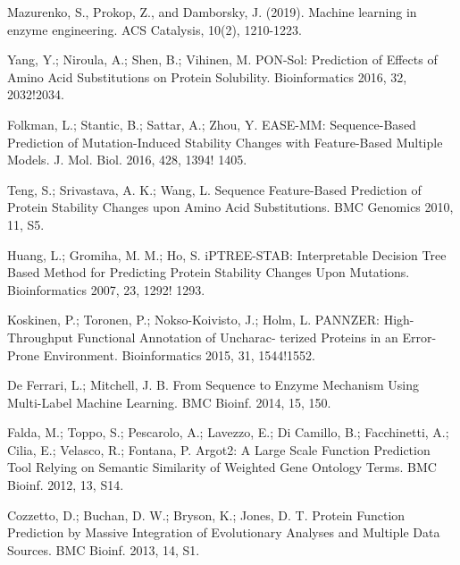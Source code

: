 \documentclass[12pt]{article}
\begin{document}
\begin{thebibliography}{20}
Mazurenko, S., Prokop, Z., and Damborsky, J. (2019). Machine learning in enzyme engineering. ACS Catalysis, 10(2), 1210-1223. 

 Yang, Y.; Niroula, A.; Shen, B.; Vihinen, M. PON-Sol: Prediction of Effects of Amino Acid Substitutions on Protein Solubility. Bioinformatics 2016, 32, 2032!2034.

 Folkman, L.; Stantic, B.; Sattar, A.; Zhou, Y. EASE-MM: Sequence-Based Prediction of Mutation-Induced Stability Changes with Feature-Based Multiple Models. J. Mol. Biol. 2016, 428, 1394! 1405.

 Teng, S.; Srivastava, A. K.; Wang, L. Sequence Feature-Based Prediction of Protein Stability Changes upon Amino Acid Substitutions. BMC Genomics 2010, 11, S5.

 Huang, L.; Gromiha, M. M.; Ho, S. iPTREE-STAB: Interpretable Decision Tree Based Method for Predicting Protein Stability Changes Upon Mutations. Bioinformatics 2007, 23, 1292! 1293.


 Koskinen, P.; Toronen, P.; Nokso-Koivisto, J.; Holm, L. PANNZER: High-Throughput Functional Annotation of Uncharac- terized Proteins in an Error-Prone Environment. Bioinformatics 2015, 31, 1544!1552.

 De Ferrari, L.; Mitchell, J. B. From Sequence to Enzyme Mechanism Using Multi-Label Machine Learning. BMC Bioinf. 2014, 15, 150.

 Falda, M.; Toppo, S.; Pescarolo, A.; Lavezzo, E.; Di Camillo, B.; Facchinetti, A.; Cilia, E.; Velasco, R.; Fontana, P. Argot2: A Large Scale Function Prediction Tool Relying on Semantic Similarity of Weighted Gene Ontology Terms. BMC Bioinf. 2012, 13, S14.

 Cozzetto, D.; Buchan, D. W.; Bryson, K.; Jones, D. T. Protein Function Prediction by Massive Integration of Evolutionary Analyses and Multiple Data Sources. BMC Bioinf. 2013, 14, S1.


\end{thebibliography}
\end{document}
